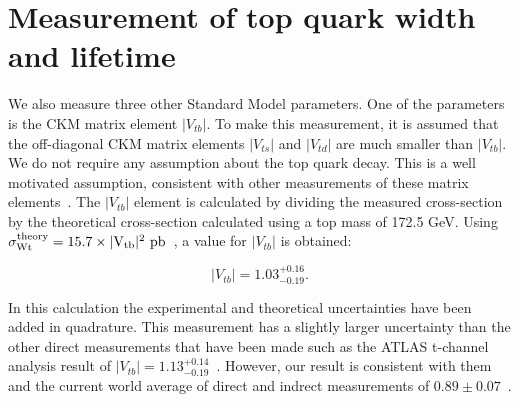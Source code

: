

\section{Measurement of top quark width and lifetime}

We also measure three other Standard Model parameters. One of the parameters is the CKM matrix element $|V_{tb}|$. To make this measurement, it is assumed that the off-diagonal CKM matrix elements $|V_{ts}|$ and $|V_{td}|$ are much smaller than $|V_{tb}|$. We do not require any assumption about the top quark decay. This is a well motivated assumption, consistent with other measurements of these matrix elements~\cite{PDG}. The $|V_{tb}|$ element is calculated by dividing the measured cross-section by the theoretical cross-section calculated using a top mass of 172.5 GeV. Using $\rm \sigma_{Wt}^{theory} = 15.7\times |V_{tb}|^{2}~pb$~\cite{SGTOP-XS2}, a value for $|V_{tb}|$ is obtained:

\begin{equation}
|V_{tb}| = 1.03^{+0.16}_{-0.19}.
\end{equation}

\noindent
In this calculation the experimental and theoretical uncertainties have been added in quadrature. This measurement has a slightly larger uncertainty than the other direct measurements that have been made such as the ATLAS t-channel analysis result of $|V_{tb}|=1.13^{+0.14}_{-0.19}$~\cite{TCHAN-ATLAS}. However, our result is consistent with them and the current world average of direct and indrect measurements of $0.89 \pm 0.07$~\cite{PDG}.

